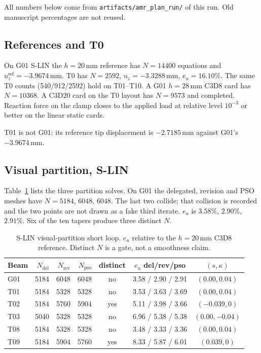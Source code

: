 \documentclass[applsci,article,submit,pdftex,oneauthor]{Definitions/mdpi}
\begin{document}
All numbers below come from \texttt{artifacts/amr\_plan\_run/} of this run. Old manuscript percentages are not reused.

\subsection{References and T0}

On G01 S-LIN the $h=20\,\mathrm{mm}$ reference has $N=14400$ equations and $u_z^{\mathrm{ref}}=-3.9674\,\mathrm{mm}$. T0 has $N=2592$, $u_z=-3.3288\,\mathrm{mm}$, $e_u=16.10\%$. The same T0 counts (540/912/2592) hold on T01--T10. A G01 $h=28\,\mathrm{mm}$ C3D8 card has $N=10368$. A C3D20 card on the T0 layout has $N=9573$ and completed. Reaction force on the clamp closes to the applied load at relative level $10^{-3}$ or better on the linear static cards.

T01 is not G01: its reference tip displacement is $-2.7185\,\mathrm{mm}$ against G01's $-3.9674\,\mathrm{mm}$.

\subsection{Visual partition, S-LIN}

Table~\ref{tab:llm} lists the three partition solves. On G01 the delegated, revision and PSO meshes have $N=5184$, $6048$, $6048$. The last two collide; that collision is recorded and the two points are not drawn as a fake third iterate. $e_u$ is $3.58\%$, $2.90\%$, $2.91\%$. Six of the ten tapers produce three distinct $N$.

\begin{table}[H]
\caption{S-LIN visual-partition short loop. $e_u$ relative to the $h=20\,\mathrm{mm}$ C3D8 reference. Distinct $N$ is a gate, not a smoothness claim.}
\label{tab:llm}
\begin{tabular}{lrrrccc}
\toprule
Beam & $N_{\mathrm{del}}$ & $N_{\mathrm{rev}}$ & $N_{\mathrm{pso}}$ & distinct & $e_u$ del/rev/pso & $(s,\kappa)$ \\
\midrule
G01 & 5184 & 6048 & 6048 & no & 3.58 / 2.90 / 2.91 & $(0.00,0.04)$ \\
T01 & 5184 & 5328 & 5328 & no & 3.53 / 3.63 / 3.69 & $(0.00,0.04)$ \\
T02 & 5184 & 5760 & 5904 & yes & 5.11 / 3.98 / 3.66 & $(-0.039,0)$ \\
T03 & 5040 & 5328 & 5328 & no & 6.96 / 5.38 / 5.38 & $(0.00,-0.04)$ \\
T08 & 5184 & 5328 & 5328 & no & 3.48 / 3.33 / 3.36 & $(0.00,0.04)$ \\
T09 & 5184 & 5904 & 5760 & yes & 8.33 / 5.87 / 6.01 & $(0.039,0)$ \\
\bottomrule
\end{tabular}
\end{table}
\end{document}
